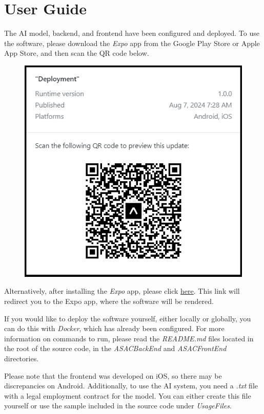 \chapter{User Guide}

The AI model, backend, and frontend have been configured and deployed. To use the software, please download the \textit{Expo} app from the Google Play Store or Apple App Store, and then scan the QR code below.

\begin{figure}[!ht]
    \centering
    \includegraphics[width=0.5\linewidth]{LATEX/Appendices/Images/Software/deployed-app-qr-code.png}
    
    \label{fig:deployed-app-qr-codel}
\end{figure}

Alternatively, after installing the \textit{Expo} app, please click \href{https://expo.dev/preview/update?message=Deployment&updateRuntimeVersion=1.0.0&createdAt=2024-08-07T06\%3A28\%3A05.730Z&slug=exp&projectId=0a2a6a79-5818-4f5a-9566-594e07108536&group=fecf04f0-ab35-4650-b482-97adfa35e0a5}{here}. This link will redirect you to the Expo app, where the software will be rendered.

If you would like to deploy the software yourself, either locally or globally, you can do this with \textit{Docker}, which has already been configured. For more information on commands to run, please read the \textit{README.md} files located in the root of the source code, in the \textit{ASACBackEnd} and \textit{ASACFrontEnd} directories.

Please note that the frontend was developed on iOS, so there may be discrepancies on Android. Additionally, to use the AI system, you need a \textit{.txt} file with a legal employment contract for the model. You can either create this file yourself or use the sample included in the source code under \textit{UsageFiles}.


